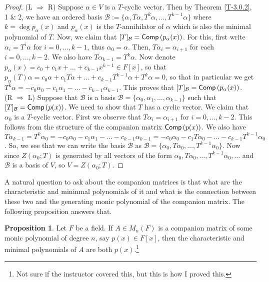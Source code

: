 \documentclass[letterpaper,11pt,twoside]{article}
\theoremstyle{definition}
\newtheorem{proposition}{Proposition}[subsection]
\theoremstyle{definition}
\theoremstyle{definition}
\theoremstyle{definition}
\theoremstyle{definition}
\theoremstyle{definition}
\theoremstyle{remark}
\theoremstyle{definition}
\newcommand{\Comp}[1]{{\fontfamily{lmss}\selectfont 
            \text{Comp}\left(#1\right)
}}
\begin{document}
    \begin{proof}
    (L $\Rightarrow$ R) Suppose $\alpha \in V$ is a $T$-cyclic vector. Then by Theorem \ref{T-3.0.2}, 1 \& 2, we have an ordered basis $\mathcal{B} := \{\alpha,T\alpha,T^2\alpha,\dots, T^{k-1}\alpha\}$ where $k = \deg p_\alpha(x)$ and $p_\alpha(x)$ is the $T$-annihilator of $\alpha$ which is also the minimal polynomial of $T$. Now, we claim that $[T]_\mathcal{B} = \Comp{p_\alpha(x)}$. For this, first write $\alpha_i = T^{i}\alpha$ for $i=0,\dots, k-1$, thus $\alpha_0 = \alpha$. Then, $T\alpha_i = \alpha_{i+1}$ for each $i=0,\dots,k-2$. We also have $T\alpha_{k-1} = T^k \alpha$. Now denote $p_\alpha(x) = c_0 + c_1x + \dots + c_{k-1}x^{k-1}\in F[x]$, so that $p_\alpha(T)\alpha = c_0\alpha + c_1T\alpha + \dots + c_{k-1}T^{k-1}\alpha + T^k\alpha= 0$, so that in particular we get $T^k\alpha = -c_0\alpha_0 - c_1 \alpha_1 - \dots - c_{k-1}\alpha_{k-1}$. This proves that $[T]_\mathcal{B} = \Comp{p_\alpha(x)}$.\\
    
    (R $\Rightarrow$ L) Suppose that $\mathcal{B}$ is a basis $\mathcal{B} = \{\alpha_0,\alpha_1,\dots, \alpha_{k-1}\}$ such that $[T]_\mathcal{B} = \Comp{p(x)}$. We need to show that $T$ has a cyclic vector. We claim that $\alpha_0$ is a $T$-cyclic vector. First we observe that $T\alpha_i = \alpha_{i+1}$ for $i=0,\dots,k-2$. This follows from the structure of the companion matrix $\Comp{p(x)}$. We also have $T\alpha_{k-1} = T^k\alpha_0 = -c_0\alpha_0 - c_1\alpha_1 -\dots - c_{k-1}\alpha_{k-1} = -c_0\alpha_0 - c_1T\alpha_0 - \dots - c_{k-1}T^{k-1}\alpha_0$. So, we see that we can write the basis $\mathcal{B}$ as $\mathcal{B} = \{ \alpha_0,T\alpha_0,\dots,T^{k-1}\alpha_0 \}$. Now since $Z(\alpha_0;T)$ is generated by all vectors of the form $\alpha_0,T\alpha_0,\dots, T^{k-1}\alpha_0,\dots$ and $\mathcal{B}$ is a basis of $V$, so $V= Z(\alpha_0;T)$.
    \end{proof}
    A natural question to ask about the companion matrices is that what are the characteristic and mininmal polynomials of it and what is the connection between these two and the generating monic polynomial of the companion matrix. The following proposition answers that.
    \begin{proposition}
    Let $F$ be a field. If $A \in M_n(F)$ is a companion matrix of some monic polynomial of degree $n$, say $p(x)\in F[x]$, then the characteristic and minimal polynomials of $A$ are both $p(x)$.\footnote{Not sure if the instructor covered this, but this is how I proved this.} 
    \end{proposition}
\end{document}
